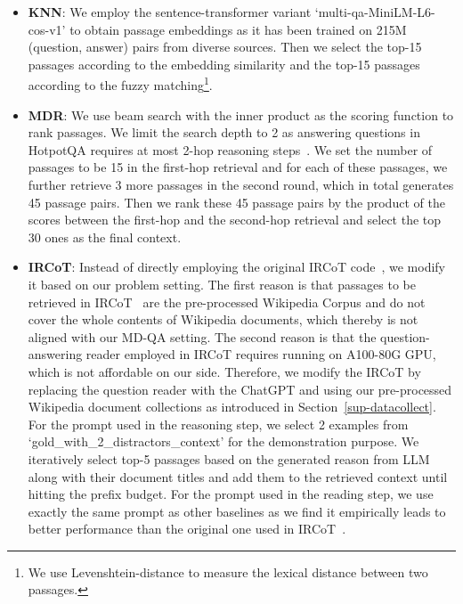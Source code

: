 \begin{itemize}[leftmargin=*]
    \item \textbf{KNN}: We employ the sentence-transformer variant `multi-qa-MiniLM-L6-cos-v1' to obtain passage embeddings as it has been trained on 215M (question, answer) pairs from diverse sources. Then we select the top-15 passages according to the embedding similarity and the top-15 passages according to the fuzzy matching\footnote{We use Levenshtein-distance to measure the lexical distance between two passages.}.

    \item \textbf{MDR}: We use beam search with the inner product as the scoring function to rank passages. We limit the search depth to 2 as answering questions in HotpotQA requires at most 2-hop reasoning steps~\cite{xiong2020answering}. We set the number of passages to be 15 in the first-hop retrieval and for each of these passages, we further retrieve 3 more passages in the second round, which in total generates 45 passage pairs. Then we rank these 45 passage pairs by the product of the scores between the first-hop and the second-hop retrieval and select the top 30 ones as the final context.

    \item \textbf{IRCoT}: Instead of directly employing the original IRCoT code~\cite{trivedi2022interleaving}, we modify it based on our problem setting. The first reason is that passages to be retrieved in IRCoT~\cite{trivedi2022interleaving} are the pre-processed Wikipedia Corpus and do not cover the whole contents of Wikipedia documents, which thereby is not aligned with our MD-QA setting. The second reason is that the question-answering reader employed in IRCoT requires running on A100-80G GPU, which is not affordable on our side. Therefore, we modify the IRCoT by replacing the question reader with the ChatGPT and using our pre-processed Wikipedia document collections as introduced in Section~\ref{sup-datacollect}. For the prompt used in the reasoning step, we select 2 examples from `gold\_with\_2\_distractors\_context' for the demonstration purpose. We iteratively select top-5 passages based on the generated reason from LLM along with their document titles and add them to the retrieved context until hitting the prefix budget. For the prompt used in the reading step, we use exactly the same prompt as other baselines as we find it empirically leads to better performance than the original one used in IRCoT~\cite{trivedi2022interleaving}.


\end{itemize}

